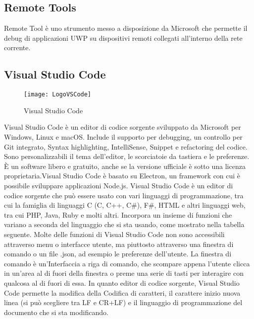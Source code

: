 \subsection{Remote Tools}
Remote Tool è uno strumento messo a disposizione da Microsoft che permette il debug di applicazioni UWP su dispositivi remoti collegati all'interno della rete corrente.
\subsection{Visual Studio Code}
\begin{figure}[htpb!]
\center
  \texttt{[image: LogoVSCode]}
  \caption{Visual Studio Code}
\end{figure}
Visual Studio Code è un editor di codice sorgente sviluppato da Microsoft per Windows, Linux e macOS. Include il supporto per debugging, un controllo per Git integrato, Syntax highlighting, IntelliSense, Snippet e refactoring del codice. Sono personalizzabili il tema dell'editor, le scorciatoie da tastiera e le preferenze. È un software libero e gratuito, anche se la versione ufficiale è sotto una licenza proprietaria.Visual Studio Code è basato su Electron, un framework con cui è possibile sviluppare applicazioni Node.js.
Visual Studio Code è un editor di codice sorgente che può essere usato con vari linguaggi di programmazione, tra cui la famiglia di linguaggi C (C, C++, C\#), F\#, HTML e altri linguaggi web, tra cui PHP, Java, Ruby e molti altri. Incorpora un insieme di funzioni che variano a seconda del linguaggio che si sta usando, come mostrato nella tabella seguente. Molte delle funzioni di Visual Studio Code non sono accessibili attraverso menu o interfacce utente, ma piuttosto attraverso una finestra di comando o un file .json, ad esempio le preferenze dell'utente. La finestra di comando è un'Interfaccia a riga di comando, che scompare appena l'utente clicca in un'area al di fuori della finestra o preme una serie di tasti per interagire con qualcosa al di fuori di essa.
In quanto editor di codice sorgente, Visual Studio Code permette la modifica della Codifica di caratteri, il carattere inizio nuova linea (si può scegliere tra LF e CR+LF) e il linguaggio di programmazione del documento che si sta modificando.


